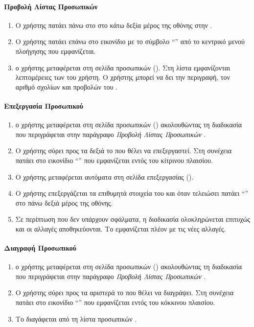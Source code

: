 \paragraph{Προβολή Λίστας Προσωπικών }
\begin{enumerate}
    \item Ο χρήστης πατάει πάνω στο  στο κάτω δεξία μέρος της οθόνης στην .
    \item Ο χρήστης πατάει επάνω στο εικονίδιο με το σύμβολο ``\textit{}'' από το κεντρικό μενού πλοήγησης που εμφανίζεται.
    \item ο χρήστης μεταφέρεται στη σελίδα προσωπικών  (\textit{}). Στη λίστα εμφανίζονται λεπτομέρειες των  του χρήστη. Ο χρήστης μπορεί να δει την περιγραφή, τον αριθμό σχολίων και προβολών του .
\end{enumerate}

\paragraph{Επεξεργασία Προσωπικού }
\begin{enumerate}
    \item ο χρήστης μεταφέρεται στη σελίδα προσωπικών  (\textit{}) ακολουθώντας τη διαδικασία που περιγράφεται στην παράγραφο \textit{Προβολή Λίστας Προσωπικών }.
    \item Ο χρήστης σύρει προς τα δεξιά το  που θέλει να επεξεργαστεί. Στη συνέχεια πατάει στο εικονίδιο ``\textit{}'' που εμφανίζεται εντός του κίτρινου πλαισίου.
    \item Ο χρήστης μεταφέρεται αυτόματα στη σελίδα επεξεργασίας  (\textit{}).
    \item Ο χρήστης επεξεργάζεται τα επιθυμητά στοιχεία του  και όταν τελειώσει πατάει ``\textit{}'' στο πάνω δεξιά μέρος της οθόνης.
    \item Σε περίπτωση που δεν υπάρχουν σφάλματα, η διαδικασία ολοκληρώνεται επιτυχώς και οι αλλαγές αποθηκεύονται. Το  εμφανίζεται πλέον με τις νέες αλλαγές.
    
\end{enumerate}

\paragraph{Διαγραφή Προσωπικού }
\begin{enumerate}
    \item ο χρήστης μεταφέρεται στη σελίδα προσωπικών  (\textit{}) ακολουθώντας τη διαδικασία που περιγράφεται στην παράγραφο \textit{Προβολή Λίστας Προσωπικών }.
    \item Ο χρήστης σύρει προς τα αριστερά το  που θέλει να διαγράψει. Στη συνέχεια πατάει στο εικονίδιο ``\textit{}'' που εμφανίζεται εντός του κόκκινου πλαισίου.
    \item Το  διαγάφεται από τη λίστα προσωπικών .
\end{enumerate}


